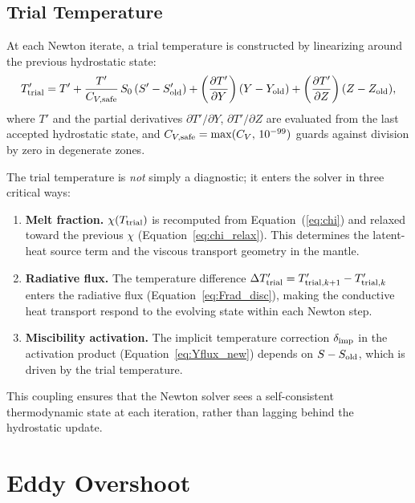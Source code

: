 \documentclass{aastex631}
\newcommand{\pp}{\partial}
\begin{document}
\subsection{Trial Temperature}\label{sec:trial_temp}

At each Newton iterate, a trial temperature is constructed by
linearizing around the previous hydrostatic state:
\begin{equation}\label{eq:Ttrial}
  T'_{\rm trial}
  = T' + \frac{T'}{C_{V,{\rm safe}}}\,S_0\,(S' - S'_{\rm old})
  + \left(\frac{\pp T'}{\pp Y}\right)(Y - Y_{\rm old})
  + \left(\frac{\pp T'}{\pp Z}\right)(Z - Z_{\rm old}),
\end{equation}
where $T'$ and the partial derivatives $\pp T'/\pp Y$,
$\pp T'/\pp Z$ are evaluated from the last accepted hydrostatic
state, and $C_{V,{\rm safe}} = \max(C_V,\,10^{-99})$ guards
against division by zero in degenerate zones.

The trial temperature is \emph{not} simply a diagnostic; it
enters the solver in three critical ways:
\begin{enumerate}
  \item \textbf{Melt fraction.}
    $\chi(T_{\rm trial})$ is recomputed from
    Equation~(\ref{eq:chi}) and relaxed toward the previous $\chi$
    (Equation~\ref{eq:chi_relax}).  This determines the latent-heat
    source term and the viscous transport geometry in the mantle.
  \item \textbf{Radiative flux.}
    The temperature difference
    $\Delta T'_{\rm trial} = T'_{{\rm trial},k+1} - T'_{{\rm trial},k}$
    enters the radiative flux
    (Equation~\ref{eq:Frad_disc}), making the conductive heat
    transport respond to the evolving state within each Newton step.
  \item \textbf{Miscibility activation.}
    The implicit temperature correction $\delta_{\rm imp}$ in the
    activation product (Equation~\ref{eq:Yflux_new}) depends on
    $S - S_{\rm old}$, which is driven by the trial temperature.
\end{enumerate}
This coupling ensures that the Newton solver sees a self-consistent
thermodynamic state at each iteration, rather than lagging behind
the hydrostatic update.

\section{Eddy Overshoot}\label{sec:overshoot}
\end{document}
